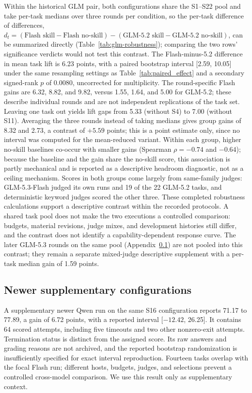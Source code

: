\documentclass[11pt]{article}
\begin{document}


Within the historical GLM pair, both configurations share the S1--S22 pool and take per-task medians over three rounds per condition, so the per-task difference of differences, $d_t = (\text{Flash skill} - \text{Flash no-skill}) - (\text{GLM-5.2 skill} - \text{GLM-5.2 no-skill})$, can be summarized directly (Table~\ref{tab:glm-robustness}); comparing the two rows' significance verdicts would not test this contrast. The Flash-minus-5.2 difference in mean task lift is 6.23 points, with a paired bootstrap interval [2.59, 10.05] under the same resampling settings as Table~\ref{tab:paired_effect} and a secondary signed-rank $p$ of 0.0080, uncorrected for multiplicity. The round-specific Flash gains are 6.32, 8.82, and 9.82, versus 1.55, 1.64, and 5.00 for GLM-5.2; these describe individual rounds and are not independent replications of the task set. Leaving one task out yields lift gaps from 5.33 (without S4) to 7.00 (without S11). Averaging the three rounds instead of taking medians gives group gains of 8.32 and 2.73, a contrast of $+5.59$ points; this is a point estimate only, since no interval was computed for the mean-reduced variant. Within each group, higher no-skill baselines co-occur with smaller gains (Spearman $\rho = -0.74$ and $-0.64$); because the baseline and the gain share the no-skill score, this association is partly mechanical and is reported as a descriptive headroom diagnostic, not as a ceiling mechanism. Scores in both groups come largely from same-family judges: GLM-5.3-Flash judged its own runs and 19 of the 22 GLM-5.2 tasks, and deterministic keyword judges scored the other three. These completed robustness calculations support a descriptive contrast within the recorded protocols. A shared task pool does not make the two executions a controlled comparison: budgets, material revisions, judge mixes, and development histories still differ, and the contrast does not identify a capability-dependent response curve. The later GLM-5.3 rounds on the same pool (Appendix~\ref{app:supplementary}) are not pooled into this contrast; they remain a separate mixed-judge descriptive supplement with a per-task median gain of 1.59 points.



\subsection{Newer supplementary configurations}\label{app:supplementary}
A supplementary newer Qwen run on the same S16 configuration reports 71.17 to 77.89, a gain of 6.72 points, with a reported interval [$-12.42$, 26.25]. It contains 64 scored attempts, including five timeouts and two other nonzero-exit attempts. Termination status is distinct from the assigned score. Its raw answers and grading reasons are not archived, and the reported bootstrap randomization is insufficiently specified for exact interval reproduction. Fourteen tasks overlap with the focal Flash run; different hosts, budgets, judges, and selections prevent a controlled cross-model comparison. We use this result only as supplementary context.
\end{document}
